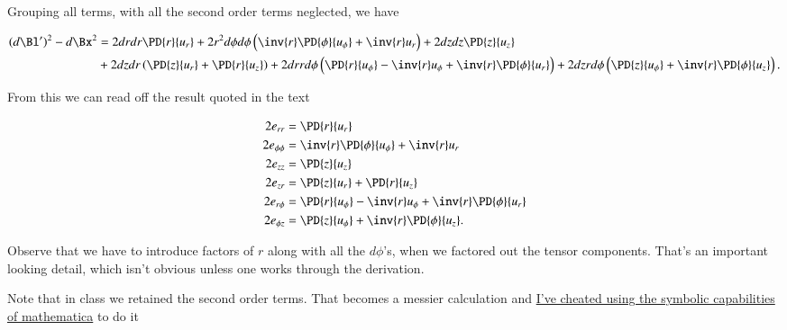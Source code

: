 Grouping all terms, with all the second order terms neglected, we have

\begin{equation}\label{eqn:continuumL2:450}
\begin{aligned}
(d\Bl')^2 - d\Bx^2
&=
2 dr dr \PD{r}{u_r} 
+ 2 r^2 d\phi d\phi \left( \inv{r} \PD{\phi}{u_\phi} +\inv{r} u_r \right)
+ 2 dz dz \PD{z}{u_z}  \\
&+ 2 dz dr \left( \PD{z}{u_r} + \PD{r}{u_z} \right)
+ 2 dr r d\phi \left( \PD{r}{u_\phi} - \inv{r} u_\phi + \inv{r} \PD{\phi}{u_r} \right)
+ 2 dz r d\phi \left( \PD{z}{u_\phi} +\inv{r} \PD{\phi}{u_z} \right).
\end{aligned}
\end{equation}

From this we can read off the result quoted in the text

\begin{align}\label{eqn:continuumL2:470}
2 e_{rr} &= \PD{r}{u_r}  \\
2 e_{\phi\phi} &= \inv{r} \PD{\phi}{u_\phi} +\inv{r} u_r  \\
2 e_{zz} &= \PD{z}{u_z}  \\
2 e_{zr} &= \PD{z}{u_r} + \PD{r}{u_z} \\
2 e_{r\phi} &= \PD{r}{u_\phi} - \inv{r} u_\phi + \inv{r} \PD{\phi}{u_r} \\
2 e_{\phi z} &= \PD{z}{u_\phi} +\inv{r} \PD{\phi}{u_z}.
\end{align}

Observe that we have to introduce factors of $r$ along with all the $d\phi$'s, when we factored out the tensor components.  That's an important looking detail, which isn't obvious unless one works through the derivation.

Note that in class we retained the second order terms.  That becomes a messier calculation and \href{https://github.com/peeterjoot/physicsplay/blob/master/notes/phy454/strainTensorCylindrical.cdf}{I've cheated using the symbolic capabilities of mathematica} to do it


